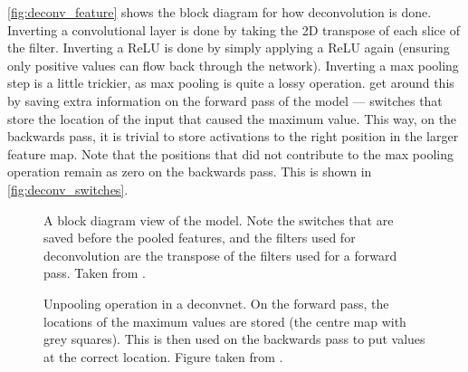   \autoref{fig:deconv_feature} shows the block diagram for how deconvolution is
  done. Inverting a convolutional layer is done by taking the 2D transpose of each
  slice of the filter. Inverting a ReLU is done by simply applying a ReLU again
  (ensuring only positive values can flow back through the network). Inverting
  a max pooling step is a little trickier, as max pooling is quite a lossy
  operation. \citeauthor{zeiler_adaptive_2011} get around this by saving extra
  information on the forward pass of the model --- switches that store the
  location of the input that caused the maximum value. This way, on the
  backwards pass, it is trivial to store activations to the right position in
  the larger feature map. Note that the positions that did not contribute to
  the max pooling operation remain as zero on the backwards pass. This is shown
  in \autoref{fig:deconv_switches}.

  \begin{figure}
    \centering
      \caption[Deconvolution Network Block Diagram]
              {A block diagram view of the model. Note the switches that
              are saved before the pooled features, and the filters
              used for deconvolution are the transpose of the filters used for
              a forward pass. Taken from
              \citep{zeiler_visualizing_2014}.}
      \label{fig:deconv_feature}
  \end{figure}

  \begin{figure}
    \centering
      \caption[Unpooling operation in a deconvnet]
              {Unpooling operation in a deconvnet. On the forward pass, the
              locations of the maximum values are stored (the centre map with
              grey squares). This is then used on the backwards pass to put
              values at the correct location. Figure taken from \citep{zeiler_visualizing_2014}.}
      \label{fig:deconv_switches}
  \end{figure}
  
